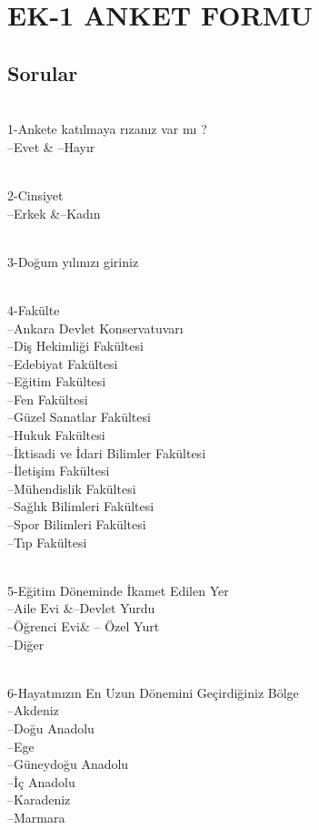 \documentclass[turkish]{article}
\begin{document}
\section{EK-1 ANKET FORMU}
\subsection{Sorular}
\\1-Ankete katılmaya rızanız var mı ?
  \\--Evet & --Hayır

\\2-Cinsiyet
   \\--Erkek &--Kadın

\\3-Doğum yılınızı giriniz


\\4-Fakülte
\\   --Ankara Devlet Konservatuvarı
  \\ --Diş Hekimliği Fakültesi
\\   --Edebiyat Fakültesi
  \\ --Eğitim Fakültesi
  \\ --Fen Fakültesi
  \\ --Güzel Sanatlar Fakültesi
   \\--Hukuk Fakültesi
 \\  --İktisadi ve İdari Bilimler Fakültesi
  \\ --İletişim Fakültesi
  \\ --Mühendislik Fakültesi
   \\--Sağlık Bilimleri Fakültesi
  \\ --Spor Bilimleri Fakültesi
   \\--Tıp Fakültesi

\\5-Eğitim Döneminde İkamet Edilen Yer
  \\ --Aile Evi &--Devlet Yurdu
  \\ --Öğrenci Evi& -- Özel Yurt
  \\ --Diğer

\\6-Hayatınızın En Uzun Dönemini Geçirdiğiniz Bölge
  \\ --Akdeniz
  \\ --Doğu Anadolu
  \\ --Ege
 \\  --Güneydoğu Anadolu
  \\ --İç Anadolu
  \\ --Karadeniz
  \\ --Marmara
\end{document}
